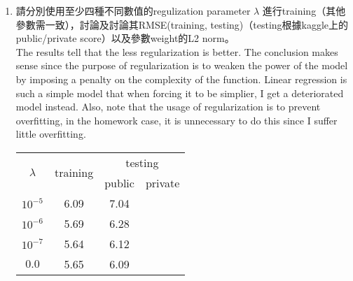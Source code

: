\documentclass[12pt, a4paper]{article}
\begin{document}
\begin{enumerate}
\item 請分別使用至少四種不同數值的regulization parameter $\lambda$ 進行training（其他參數需一致），討論及討論其RMSE(training, testing)（testing根據kaggle上的public/private score）以及參數weight的L2 norm。\\
The results tell that the less regularization is better. The conclusion makes sense since the purpose of regularization is to weaken the power of the model by imposing a penalty on the complexity of the function. Linear regression is such a simple model that when forcing it to be simplier, I get a deteriorated model instead. Also, note that the usage of regularization is to prevent overfitting, in the homework case, it is unnecessary to do this since I suffer little overfitting.
\begin{tabular}{|c|c|c|c|}\hline
    \multirow{2}{*}{$\lambda$}&\multirow{2}{*}{training}&\multicolumn{2}{|c|}{testing}\\ \cline{3-4}
    &&public&private\\ \hline
    $10^{-5}$&6.09&7.04&\\ \hline
    $10^{-6}$&5.69&6.28&\\ \hline
    $10^{-7}$&5.64&6.12&\\ \hline
    $0.0$&5.65&6.09&\\ \hline
\end{tabular}


\end{enumerate}
\end{document}
